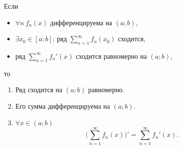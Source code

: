 \begin{corollary}
    Если
    \begin{itemize}
        \item $\forall n \ f_n(x)$ дифференцируема на $(a;b)$,
        \item $\exists x_0 \in [a;b]$: ряд $\sum_{n=1}^{\infty}f_n(x_0)$ сходится,
        \item ряд $\sum_{n=1}^{\infty}f_n'(x)$ сходится равномерно на $(a;b)$,
    \end{itemize}
    то \begin{enumerate}
        \item Ряд сходится на $(a;b)$ равномерно.
        \item Его сумма дифференцируема на $(a;b)$.
        \item $\forall x \in (a;b)$
              \[
                \bigg(\sum_{n=1}^{\infty}f_n(x)\bigg)' = \sum_{n=1}^{\infty}f_n'(x).
              \]
    \end{enumerate}
\end{corollary}




